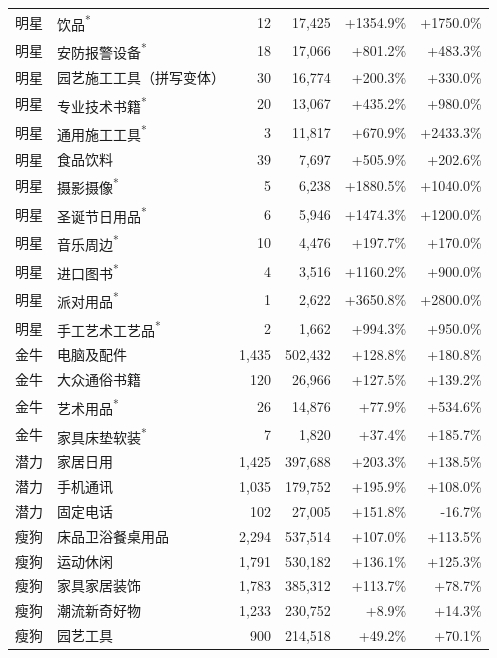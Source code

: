 \begin{longtable}{lp{5.5cm}rrrr}
明星 & 饮品\textsuperscript{*} & 12 & 17,425 & +1354.9\% & +1750.0\% \\
明星 & 安防报警设备\textsuperscript{*} & 18 & 17,066 & +801.2\% & +483.3\% \\
明星 & 园艺施工工具（拼写变体） & 30 & 16,774 & +200.3\% & +330.0\% \\
明星 & 专业技术书籍\textsuperscript{*} & 20 & 13,067 & +435.2\% & +980.0\% \\
明星 & 通用施工工具\textsuperscript{*} & 3 & 11,817 & +670.9\% & +2433.3\% \\
明星 & 食品饮料 & 39 & 7,697 & +505.9\% & +202.6\% \\
明星 & 摄影摄像\textsuperscript{*} & 5 & 6,238 & +1880.5\% & +1040.0\% \\
明星 & 圣诞节日用品\textsuperscript{*} & 6 & 5,946 & +1474.3\% & +1200.0\% \\
明星 & 音乐周边\textsuperscript{*} & 10 & 4,476 & +197.7\% & +170.0\% \\
明星 & 进口图书\textsuperscript{*} & 4 & 3,516 & +1160.2\% & +900.0\% \\
明星 & 派对用品\textsuperscript{*} & 1 & 2,622 & +3650.8\% & +2800.0\% \\
明星 & 手工艺术工艺品\textsuperscript{*} & 2 & 1,662 & +994.3\% & +950.0\% \\
\midrule
金牛 & 电脑及配件 & 1,435 & 502,432 & +128.8\% & +180.8\% \\
金牛 & 大众通俗书籍 & 120 & 26,966 & +127.5\% & +139.2\% \\
金牛 & 艺术用品\textsuperscript{*} & 26 & 14,876 & +77.9\% & +534.6\% \\
金牛 & 家具床垫软装\textsuperscript{*} & 7 & 1,820 & +37.4\% & +185.7\% \\
\midrule
潜力 & 家居日用 & 1,425 & 397,688 & +203.3\% & +138.5\% \\
潜力 & 手机通讯 & 1,035 & 179,752 & +195.9\% & +108.0\% \\
潜力 & 固定电话 & 102 & 27,005 & +151.8\% & -16.7\% \\
\midrule
瘦狗 & 床品卫浴餐桌用品 & 2,294 & 537,514 & +107.0\% & +113.5\% \\
瘦狗 & 运动休闲 & 1,791 & 530,182 & +136.1\% & +125.3\% \\
瘦狗 & 家具家居装饰 & 1,783 & 385,312 & +113.7\% & +78.7\% \\
瘦狗 & 潮流新奇好物 & 1,233 & 230,752 & +8.9\% & +14.3\% \\
瘦狗 & 园艺工具 & 900 & 214,518 & +49.2\% & +70.1\% \\

\end{longtable}
